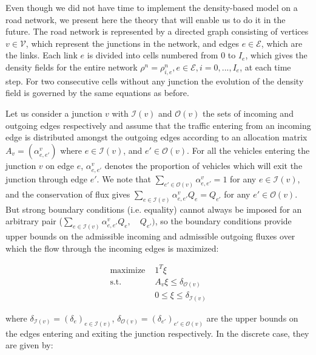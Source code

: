 \documentclass[letterpaper,10pt]{article}
\begin{document}
Even though we did not have time to implement the density-based model on a road network, we present here the theory that will enable us to do it in the future. The road network is represented by a directed graph consisting of vertices $v \in \mathcal{V}$, which represent the junctions in the network, and edges $e \in \mathcal{E}$, which are the links. Each link $e$ is divided into cells numbered from $0$ to $I_{e}$, which gives the density fields for the entire network $\rho^{n}=\rho^{n}_{i,e}, {e\in \mathcal{E}, i=0,...,I_{e}}$, at each time step. For two consecutive cells without any junction the evolution of the density field is governed by the same equations as before.

\bigskip
Let us consider a junction $v$ with $\mathcal{I}(v)$ and $\mathcal{O}(v)$ the sets of incoming and outgoing edges respectively and assume that the traffic entering from an incoming edge is distributed amongst the outgoing edges according to an allocation matrix $A_{v}=(\alpha^{v}_{e,e'})$ where $e \in \mathcal{I}(v)$, and $e' \in \mathcal{O}(v)$. For all the vehicles entering the junction $v$ on edge $e$, $\alpha^{v}_{e,e'}$ denotes the proportion of vehicles which will exit the junction through edge $e'$. We note that $\displaystyle\sum\limits_{e'\in \mathcal{O}(v)} \alpha^{v}_{e,e'} = 1$ for any $e\in \mathcal{I}(v)$, and the conservation of flux gives $\displaystyle\sum\limits_{e\in \mathcal{I}(v)} \alpha^{v}_{e,e'} Q_{e} = Q_{e'}$ for any $e' \in \mathcal{O}(v)$. But strong boundary conditions (i.e. equality) cannot always be imposed for an arbitrary pair ($\displaystyle\sum\limits_{e\in \mathcal{I}(v)} \alpha^{v}_{e,e'} Q_{e},\quad Q_{e'})$, so the boundary conditions provide upper bounds on the admissible incoming and admissible outgoing fluxes over which the flow through the incoming edges is maximized:

\begin{equation}\label{eq:rhoJunctionLP}
\begin{array}{rl}
\text{maximize } & 1^{T}\xi \\
\text{s.t. } & A_{v}\xi\leq \delta_{\mathcal{O}(v)} \\
& 0 \leq \xi \leq \delta_{\mathcal{I}(v)}
\end{array}
\end{equation}

\noindent where $\delta_{\mathcal{I}(v)} = (\delta_{e})_{e \in \mathcal{I}(v)}$, $\delta_{\mathcal{O}(v)} = (\delta_{e'})_{e' \in \mathcal{O}(v)}$ are the upper bounds on the edges entering and exiting the junction respectively. In the discrete case, they are given by:
\end{document}
